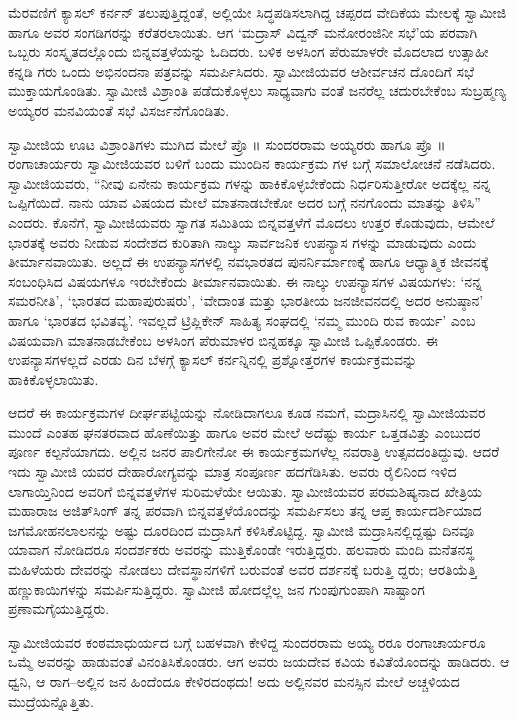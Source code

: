 ಮೆರವಣಿಗೆ ಕ್ಯಾಸಲ್ ಕರ್ನನ್ ತಲುಪುತ್ತಿದ್ದಂತೆ, ಅಲ್ಲಿಯೇ ಸಿದ್ಧಪಡಿಸಲಾಗಿದ್ದ ಚಪ್ಪರದ ವೇದಿಕೆಯ ಮೇಲಕ್ಕೆ ಸ್ವಾಮೀಜಿ ಹಾಗೂ ಅವರ ಸಂಗಡಿಗರನ್ನು ಕರೆತರಲಾಯಿತು. ಆಗ ‘ಮದ್ರಾಸ್ ವಿದ್ವನ್ ಮನೋರಂಜಿನೀ ಸಭೆ’ಯ ಪರವಾಗಿ ಒಬ್ಬರು ಸಂಸ್ಕೃತದಲ್ಲೊಂದು ಬಿನ್ನವತ್ತಳೆಯನ್ನು ಓದಿದರು. ಬಳಿಕ ಅಳಸಿಂಗ ಪೆರುಮಾಳರೇ ಮೊದಲಾದ ಉತ್ಸಾಹೀ ಕನ್ನಡಿ ಗರು ಒಂದು ಅಭಿನಂದನಾ ಪತ್ರವನ್ನು ಸಮರ್ಪಿಸಿದರು. ಸ್ವಾಮೀಜಿಯವರ ಆಶೀರ್ವಚನ ದೊಂದಿಗೆ ಸಭೆ ಮುಕ್ತಾಯಗೊಂಡಿತು. ಸ್ವಾಮೀಜಿ ವಿಶ್ರಾಂತಿ ಪಡೆದುಕೊಳ್ಳಲು ಸಾಧ್ಯವಾಗು ವಂತೆ ಜನರೆಲ್ಲ ಚದುರಬೇಕೆಂಬ ಸುಬ್ರಹ್ಮಣ್ಯ ಅಯ್ಯರರ ಮನವಿಯಂತೆ ಸಭೆ ವಿಸರ್ಜನೆಗೊಂಡಿತು.

ಸ್ವಾಮೀಜಿಯ ಊಟ ವಿಶ್ರಾಂತಿಗಳು ಮುಗಿದ ಮೇಲೆ ಪ್ರೊ ॥ ಸುಂದರರಾಮ ಅಯ್ಯರರು ಹಾಗೂ ಪ್ರೊ ॥ ರಂಗಾಚಾರ್ಯರು ಸ್ವಾಮೀಜಿಯವರ ಬಳಿಗೆ ಬಂದು ಮುಂದಿನ ಕಾರ್ಯಕ್ರಮ ಗಳ ಬಗ್ಗೆ ಸಮಾಲೋಚನೆ ನಡೆಸಿದರು. ಸ್ವಾಮೀಜಿಯವರು, “ನೀವು ಏನೇನು ಕಾರ್ಯಕ್ರಮ ಗಳನ್ನು ಹಾಕಿಕೊಳ್ಳಬೇಕೆಂದು ನಿರ್ಧರಿಸುತ್ತೀರೋ ಅದಕ್ಕೆಲ್ಲ ನನ್ನ ಒಪ್ಪಿಗೆಯಿದೆ. ನಾನು ಯಾವ ವಿಷಯದ ಮೇಲೆ ಮಾತನಾಡಬೇಕೋ ಅದರ ಬಗ್ಗೆ ನನಗೊಂದು ಮಾತನ್ನು ತಿಳಿಸಿ” ಎಂದರು. ಕೊನೆಗೆ, ಸ್ವಾಮೀಜಿಯವರು ಸ್ವಾಗತ ಸಮಿತಿಯ ಬಿನ್ನವತ್ತಳೆಗೆ ಮೊದಲು ಉತ್ತರ ಕೊಡುವುದು, ಆಮೇಲೆ ಭಾರತಕ್ಕೆ ಅವರು ನೀಡುವ ಸಂದೇಶದ ಕುರಿತಾಗಿ ನಾಲ್ಕು ಸಾರ್ವಜನಿಕ ಉಪನ್ಯಾಸ ಗಳನ್ನು ಮಾಡುವುದು ಎಂದು ತೀರ್ಮಾನವಾಯಿತು. ಅಲ್ಲದೆ ಈ ಉಪನ್ಯಾಸಗಳಲ್ಲಿ ನವಭಾರತದ ಪುನರ್ನಿರ್ಮಾಣಕ್ಕೆ ಹಾಗೂ ಆಧ್ಯಾತ್ಮಿಕ ಜೀವನಕ್ಕೆ ಸಂಬಂಧಿಸಿದ ವಿಷಯಗಳೂ ಇರಬೇಕೆಂದು ತೀರ್ಮಾನವಾಯಿತು. ಈ ನಾಲ್ಕು ಉಪನ್ಯಾಸಗಳ ವಿಷಯಗಳು: ‘ನನ್ನ ಸಮರನೀತಿ’, ‘ಭಾರತದ ಮಹಾಪುರುಷರು’, ‘ವೇದಾಂತ ಮತ್ತು ಭಾರತೀಯ ಜನಜೀವನದಲ್ಲಿ ಅದರ ಅನುಷ್ಠಾನ’ ಹಾಗೂ ‘ಭಾರತದ ಭವಿತವ್ಯ’. ಇವಲ್ಲದೆ ಟ್ರಿಪ್ಲಿಕೇನ್ ಸಾಹಿತ್ಯ ಸಂಘದಲ್ಲಿ ‘ನಮ್ಮ ಮುಂದಿ ರುವ ಕಾರ್ಯ’ ಎಂಬ ವಿಷಯವಾಗಿ ಮಾತನಾಡಬೇಕೆಂಬ ಅಳಸಿಂಗ ಪೆರುಮಾಳರ ಬಿನ್ನಹಕ್ಕೂ ಸ್ವಾಮೀಜಿ ಒಪ್ಪಿಕೊಂಡರು. ಈ ಉಪನ್ಯಾಸಗಳಲ್ಲದೆ ಎರಡು ದಿನ ಬೆಳಗ್ಗೆ ಕ್ಯಾಸಲ್ ಕರ್ನನ್ನಿನಲ್ಲಿ ಪ್ರಶ್ನೋತ್ತರಗಳ ಕಾರ್ಯಕ್ರಮವನ್ನು ಹಾಕಿಕೊಳ್ಳಲಾಯಿತು.

ಆದರೆ ಈ ಕಾರ್ಯಕ್ರಮಗಳ ದೀರ್ಘಪಟ್ಟಿಯನ್ನು ನೋಡಿದಾಗಲೂ ಕೂಡ ನಮಗೆ, ಮದ್ರಾಸಿನಲ್ಲಿ ಸ್ವಾಮೀಜಿಯವರ ಮುಂದೆ ಎಂತಹ ಘನತರವಾದ ಹೊಣೆಯಿತ್ತು ಹಾಗೂ ಅವರ ಮೇಲೆ ಅದೆಷ್ಟು ಕಾರ್ಯ ಒತ್ತಡವಿತ್ತು ಎಂಬುದರ ಪೂರ್ಣ ಕಲ್ಪನೆಯಾಗದು. ಅಲ್ಲಿನ ಜನರ ಪಾಲಿಗೇನೋ ಈ ಕಾರ್ಯಕ್ರಮಗಳೆಲ್ಲ ನವರಾತ್ರಿ ಉತ್ಸವದಂತಿದ್ದುವು. ಆದರೆ ಇದು ಸ್ವಾಮೀಜಿ ಯವರ ದೇಹಾರೋಗ್ಯವನ್ನು ಮಾತ್ರ ಸಂಪೂರ್ಣ ಹದಗೆಡಿಸಿತು. ಅವರು ರೈಲಿನಿಂದ ಇಳಿದ ಲಾಗಾಯ್ತಿನಿಂದ ಅವರಿಗೆ ಬಿನ್ನವತ್ತಳೆಗಳ ಸುರಿಮಳೆಯೇ ಆಯಿತು. ಸ್ವಾಮೀಜಿಯವರ ಪರಮಶಿಷ್ಯನಾದ ಖೇತ್ರಿಯ ಮಹಾರಾಜ ಅಜಿತ್​ಸಿಂಗ್ ತನ್ನ ಪರವಾಗಿ ಬಿನ್ನವತ್ತಳೆಯೊಂದನ್ನು ಸಮರ್ಪಿಸಲು ತನ್ನ ಆಪ್ತ ಕಾರ್ಯದರ್ಶಿಯಾದ ಜಗಮೋಹನಲಾಲನನ್ನು ಅಷ್ಟು ದೂರದಿಂದ ಮದ್ರಾಸಿಗೆ ಕಳಿಸಿಕೊಟ್ಟಿದ್ದ. ಸ್ವಾಮೀಜಿ ಮದ್ರಾಸಿನಲ್ಲಿದ್ದಷ್ಟು ದಿನವೂ ಯಾವಾಗ ನೋಡಿದರೂ ಸಂದರ್ಶಕರು ಅವರನ್ನು ಮುತ್ತಿಕೊಂಡೇ ಇರುತ್ತಿದ್ದರು. ಹಲವಾರು ಮಂದಿ ಮನೆತನಸ್ಥ ಮಹಿಳೆಯರು ದೇವರನ್ನು ನೋಡಲು ದೇವಸ್ಥಾನಗಳಿಗೆ ಬರುವಂತೆ ಅವರ ದರ್ಶನಕ್ಕೆ ಬರುತ್ತಿ ದ್ದರು; ಆರತಿಯೆತ್ತಿ ಹಣ್ಣುಕಾಯಿಗಳನ್ನು ಸಮರ್ಪಿಸುತ್ತಿದ್ದರು. ಸ್ವಾಮೀಜಿ ಹೋದಲ್ಲೆಲ್ಲ ಜನ ಗುಂಪುಗುಂಪಾಗಿ ಸಾಷ್ಟಾಂಗ ಪ್ರಣಾಮಗೈಯುತ್ತಿದ್ದರು.

ಸ್ವಾಮೀಜಿಯವರ ಕಂಠಮಾಧುರ್ಯದ ಬಗ್ಗೆ ಬಹಳವಾಗಿ ಕೇಳಿದ್ದ ಸುಂದರರಾಮ ಅಯ್ಯ ರರೂ ರಂಗಾಚಾರ್ಯರೂ ಒಮ್ಮೆ ಅವರನ್ನು ಹಾಡುವಂತೆ ವಿನಂತಿಸಿಕೊಂಡರು. ಆಗ ಅವರು ಜಯದೇವ ಕವಿಯ ಕವಿತೆಯೊಂದನ್ನು ಹಾಡಿದರು. ಆ ಧ್ವನಿ, ಆ ರಾಗ–ಅಲ್ಲಿನ ಜನ ಹಿಂದೆಂದೂ ಕೇಳಿರದಂಥದು! ಅದು ಅಲ್ಲಿನವರ ಮನಸ್ಸಿನ ಮೇಲೆ ಅಚ್ಚಳಿಯದ ಮುದ್ರೆಯನ್ನೊತ್ತಿತು.

